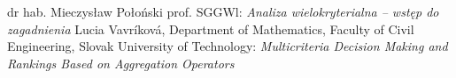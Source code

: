 \documentclass[a4paper,11pt]{article}
\begin{document}
\begin{thebibliography}{99}
dr hab. Mieczysław Połoński prof. SGGWl:
\emph{Analiza wielokryterialna – wstęp do zagadnienia}
Lucia Vavríková,  Department of Mathematics, Faculty of Civil Engineering, Slovak University of Technology:
\emph{Multicriteria Decision Making and Rankings Based on Aggregation Operators}
\end{thebibliography}
\end{document}

